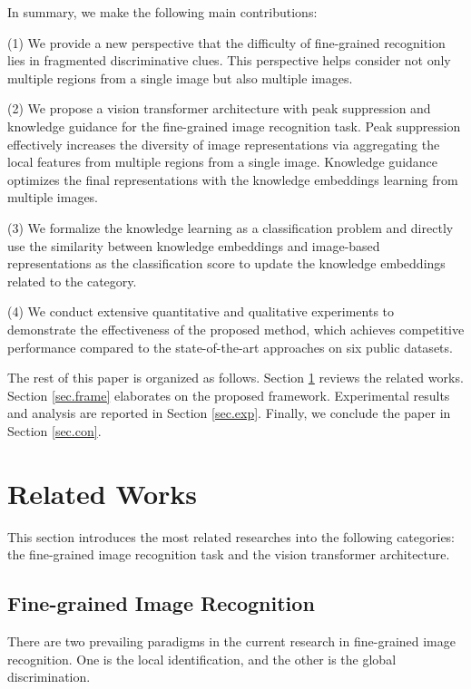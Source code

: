 \documentclass[5p,twocolumn]{elsarticle}
\begin{document}
In summary, we make the following main contributions:

(1) We provide a new perspective that the difficulty of fine-grained recognition lies in fragmented discriminative clues. This perspective helps consider not only multiple regions from a single image but also multiple images.

(2) We propose a vision transformer architecture with peak suppression and knowledge guidance for the fine-grained image recognition task. Peak suppression effectively increases the diversity of image representations via aggregating the local features from multiple regions from a single image.  Knowledge guidance optimizes the final representations with the knowledge embeddings learning from multiple images.

(3) We formalize the knowledge learning as a classification problem and directly use the similarity between knowledge embeddings and image-based representations as the classification score to update the knowledge embeddings related to the category.

(4) We conduct extensive quantitative and qualitative experiments to demonstrate the effectiveness of the proposed method, which achieves competitive performance compared to the state-of-the-art approaches on six public datasets.



The rest of this paper is organized as follows. Section \ref{sec.rel} reviews the related works. Section \ref{sec.frame} elaborates on the proposed framework. Experimental results and analysis are reported in Section \ref{sec.exp}. Finally, we conclude the paper in Section \ref{sec.con}.


\section{Related Works} \label{sec.rel}
This section introduces the most related researches into the following categories: the fine-grained image recognition task and the vision transformer architecture.
\subsection{Fine-grained Image Recognition}

There are two prevailing paradigms in the current research in fine-grained image recognition. 
One is the local identification, and the other is the global discrimination.
\end{document}
